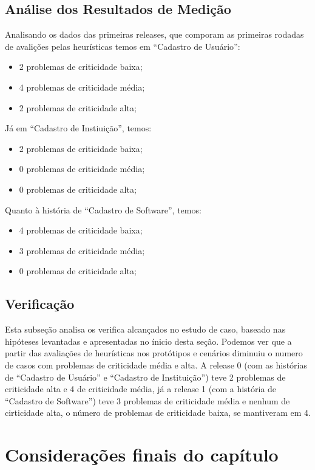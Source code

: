  




\subsection{Análise dos Resultados de Medição}


Analisando os dados das primeiras releases, que comporam as primeiras rodadas de avalições pelas heurísticas temos em ``Cadastro de Usuário'':
\begin{itemize}
	\item 2 problemas de criticidade baixa;
	\item 4 problemas de criticidade média;
	\item 2 problemas de criticidade alta;
\end{itemize}

Já em ``Cadastro de Instiuição'', temos:
\begin{itemize}
	\item 2 problemas de criticidade baixa;
	\item 0 problemas de criticidade média;
	\item 0 problemas de criticidade alta;
\end{itemize}

Quanto à história de ``Cadastro de  Software'', temos:
\begin{itemize}
	\item 4 problemas de criticidade baixa;
	\item 3 problemas de criticidade média;
	\item 0 problemas de criticidade alta;
\end{itemize}

\subsection{Verificação}

Esta subseção analisa os verifica alcançados no estudo de caso, baseado nas hipóteses levantadas e apresentadas no ínicio desta seção. Podemos ver que a partir das avaliações de heurísticas nos protótipos e cenários diminuiu o numero de casos com problemas de criticidade média e alta. A release 0 (com as histórias de ``Cadastro de Usuário'' e ``Cadastro de Instituição'') teve 2 problemas de criticidade alta e 4 de criticidade média, já a release 1 (com a história de ``Cadastro de Software'') teve 3 problemas de criticidade média e nenhum de cirticidade alta, o número de problemas de criticidade baixa, se mantiveram em 4.



\section{Considerações finais do capítulo}







